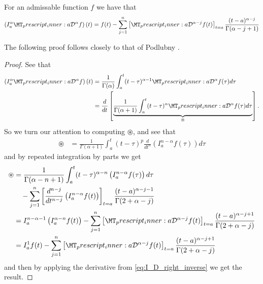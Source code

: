 \begin{lemma}
    \label{lem:rld_right_res}
    For an admissable function $ f $ we have that
    \begin{align}
        \left(I_a^\alpha \prescript{}{a}{\mathcal{D}}^\alpha f\right)(t) = f(t) - \sum_{j=1}^{n} \left[ \prescript{}{a}{\mathcal{D}}^{\alpha - j}f(t)\right]_{t=a} \frac{(t-a)^{\alpha - j}}{\Gamma(\alpha - j + 1)}
    \end{align}
\end{lemma}
The following proof follows closely to that of Podlubny \cite{Podlubny1999}.
\begin{proof}
    See that
    \begin{align}
        \left(I_a^\alpha \prescript{}{a}{\mathcal{D}}^\alpha f\right)(t) &= \frac{1}{\Gamma(\alpha)} \int_a^t (t-\tau)^{\alpha - 1} \prescript{}{a}{\mathcal{D}}^\alpha f(\tau)d\tau \\
    \label{eq:I_D_right_inverse}
    &= \frac{d}{dt} \left[ \underbrace{\frac{1}{\Gamma(\alpha + 1)} \int_a^t (t-\tau)^\alpha \prescript{}{a}{\mathcal{D}}^\alpha f(\tau) d\tau}_{\circledast}\right].
    \end{align}
So we turn our attention to computing $\circledast $,
and see that
    \begin{align}
        \circledast &= \frac{1}{\Gamma(\alpha + 1)} \int_a^t (t-\tau)^p \frac{d}{dt^n} \left( I_a^{n - \alpha} f(\tau)\right) d\tau
    \end{align}
and by repeated integration by parts we get
    \begin{align}
        \circledast &= \frac{1}{\Gamma(\alpha - n + 1)}\int_a^t (t-\tau)^{\alpha - n} \left( I_a^{n - \alpha}f(\tau) \right) d\tau \\
        & \ \ \ - \sum_{j=1}^n \left[ \frac{d^{n-j}}{dt^{n-j}} \left( I_a^{n - \alpha} f(t) \right) \right]_{t=a} \frac{(t-a)^{\alpha - j -1}}{\Gamma(2 + \alpha - j)} \\
        \label{eq:negative_frac_deriv_1}
        &= I_a^{n-\alpha - 1} \left( I_a^{\alpha - n} f(t) \right) - \sum_{j=1}^n \left[ \prescript{}{a}{\mathcal{D}}^{\alpha - j} f(t)\right]_{t=a} \frac{(t-a)^{\alpha - j + 1}}{\Gamma(2 + \alpha - j)} \\
        \label{eq:negative_frac_deriv_2}
        &= I_{a}^{1} f(t) - \sum_{j=1}^n \left[ \prescript{}{a}{\mathcal{D}}^{\alpha - j} f(t) \right]_{t=a} \frac{(t-a)^{\alpha - j + 1}}{\Gamma(2 + \alpha - j)}
    \end{align}
and then 
by applying the derivative from \eqref{eq:I_D_right_inverse} we get the result. 
\end{proof}

